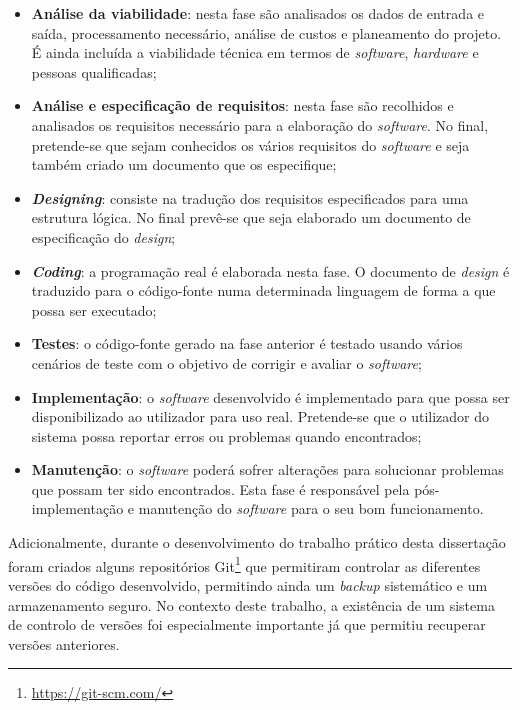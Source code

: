 \begin{itemize}
	\item \textbf{Análise da viabilidade}: nesta fase são analisados os dados de entrada e saída, processamento necessário, análise de custos e planeamento do projeto. É ainda incluída a viabilidade técnica em termos de \textit{software}, \textit{hardware} e pessoas qualificadas;
	
	\item \textbf{Análise e especificação de requisitos}: nesta fase são recolhidos e analisados os requisitos necessário para a elaboração do \textit{software}. No final, pretende-se que sejam conhecidos os vários requisitos do \textit{software} e seja também criado um documento que os especifique; 
	
	\item  \textbf{\textit{Designing}}: consiste na tradução dos requisitos especificados para uma estrutura lógica. No final prevê-se que seja elaborado um documento de especificação do \textit{design}; 
	
	
	\item  \textbf{\textit{Coding}}: a programação real é elaborada nesta fase. O documento de \textit{design} é traduzido para o código-fonte numa determinada linguagem de forma a que possa ser executado;
	
	\item \textbf{Testes}: o código-fonte gerado na fase anterior é testado usando vários cenários de teste com o objetivo de corrigir e avaliar o \textit{software}; 
	
	\item  \textbf{Implementação}: o \textit{software} desenvolvido é implementado para que possa ser disponibilizado ao utilizador para uso real. Pretende-se que o utilizador do sistema possa reportar erros ou problemas quando encontrados; 
	
	\item  \textbf{Manutenção}: o \textit{software} poderá sofrer alterações para solucionar problemas que possam ter sido encontrados. Esta fase é responsável pela pós-implementação e manutenção do \textit{software} para o seu bom funcionamento.
	
\end{itemize}


Adicionalmente, durante o desenvolvimento do trabalho prático desta dissertação foram criados alguns repositórios Git\footnote{\url{https://git-scm.com/}} que permitiram controlar as diferentes versões do código desenvolvido, permitindo ainda um \textit{backup} sistemático e um armazenamento seguro. No contexto deste trabalho, a existência de um sistema de controlo de versões foi especialmente importante já que permitiu recuperar versões anteriores. 








